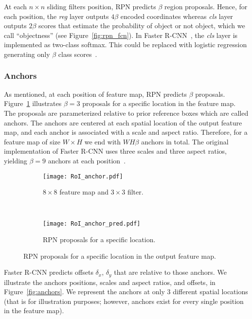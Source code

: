 %
At each $n\times n$ sliding filters position, RPN predicts $\beta$ region proposals.
Hence, for each position, the {\it reg} layer outputs $4\beta$ encoded coordinates whereas {\it cls} layer outputs $2\beta$ scores that estimate the probability of object or not object, which we call ``objectness'' (see Figure~\ref{fig:rpn_fcn}).
In Faster R-CNN~\cite{Ren2017fasterpami}, the {\it cls} layer is implemented as two-class softmax.
This could be replaced with logistic regression generating only $\beta$ class scores~\cite{Ren2017fasterpami}.


\subsubsection{Anchors}


As mentioned, at each position of feature map, RPN predicts $\beta$ proposals.
Figure~\ref{fig:rpn_pred} illustrates $\beta=3$ proposals for a specific location in the feature map.
The proposals are parameterized relative to prior reference boxes which are called anchors.
The anchors are centered at each spatial location of the output feature map, and each anchor is associated with a scale and aspect ratio.
Therefore, for a feature map of size $W\times H$ we end with $WH\beta$ anchors in total.
The original implementation of Faster R-CNN uses three scales and three aspect ratios, yielding $\beta=9$ anchors at each position~\cite{Ren2017fasterpami}.
%
%
\begin{figure}[th!]
  \centering
  \begin{subfigure}[t]{0.49\linewidth}
    \centering
    \texttt{[image: RoI\_anchor.pdf]}
    \caption{$8\times 8$ feature map and $3\times3$ filter.}
  \end{subfigure}~
  \begin{subfigure}[t]{0.49\linewidth}
    \centering
    \texttt{[image: RoI\_anchor\_pred.pdf]}
    \caption{RPN proposals for a specific location.}
  \end{subfigure}
  \caption{RPN proposals for a specific location in the output feature map.}
  \label{fig:rpn_pred}
\end{figure}
%
Faster R-CNN predicts offsets $\delta_x$, $\delta_y$ that are relative to those anchors.
We illustrate the anchors positions, scales and aspect ratios, and offsets, in Figure~\ref{fig:anchors}.
We represent the anchors at only 3 different spatial locations (that is for illustration purposes; however, anchors exist for every single position in the feature map).
